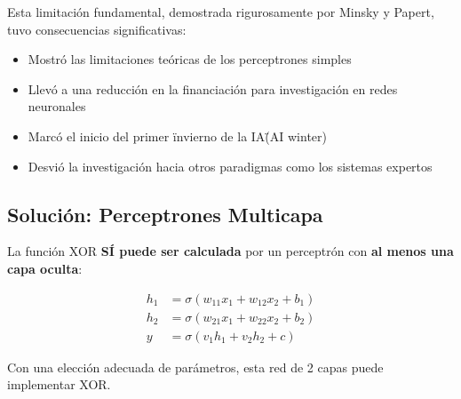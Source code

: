 \documentclass[12pt]{article}
\begin{document}
Esta limitación fundamental, demostrada rigurosamente por Minsky y Papert, tuvo consecuencias significativas:

\begin{itemize}
\item Mostró las limitaciones teóricas de los perceptrones simples
\item Llevó a una reducción en la financiación para investigación en redes neuronales
\item Marcó el inicio del primer \"invierno de la IA\" (AI winter)
\item Desvió la investigación hacia otros paradigmas como los sistemas expertos
\end{itemize}

\subsection{Solución: Perceptrones Multicapa}

La función XOR \textbf{SÍ puede ser calculada} por un perceptrón con \textbf{al menos una capa oculta}:

\begin{align}
h_1 &= \sigma(w_{11}x_1 + w_{12}x_2 + b_1) \\
h_2 &= \sigma(w_{21}x_1 + w_{22}x_2 + b_2) \\
y &= \sigma(v_1h_1 + v_2h_2 + c)
\end{align}

Con una elección adecuada de parámetros, esta red de 2 capas puede implementar XOR.
\end{document}
